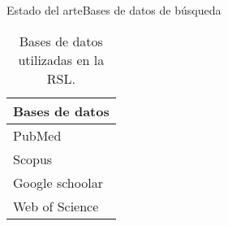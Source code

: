 \documentclass[10pt]{beamer}
\newcommand{\1}{
	\setbeamertemplate{background}{
		\texttt{[image: img/1]}
		\tikz[overlay] \fill[fill opacity=0.75,fill=white] (0,0) rectangle (-\paperwidth,\paperheight);
	}
}
\begin{document}
\begin{frame}{Estado del arte}{Bases de datos de búsqueda}
	
	\begin{table}[H]
		\centering
		\begin{center}
			\caption{Bases de datos utilizadas en la RSL.}
			\label{tab:bd_RSL}
			\setlength{\tabcolsep}{0.5em} %
			{\renewcommand{\arraystretch}{1.2}%
				\begin{tabular}{p{3cm}}
					\textbf{Bases de datos} \\ \hline
					PubMed                                                                               \\
					Scopus \\				
					Google schoolar          \\
					Web of Science                                                                                               
				\end{tabular}
			}
		\end{center}
	\end{table}
	
\end{frame}
\end{document}
